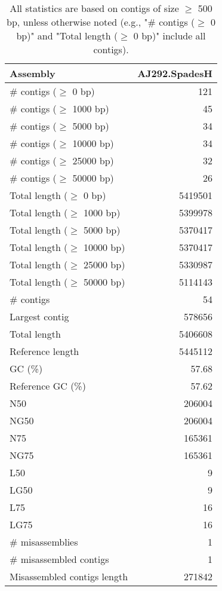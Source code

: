 \documentclass[12pt,a4paper]{article}
\begin{document}
\begin{table}[ht]
\begin{center}
\caption{All statistics are based on contigs of size $\geq$ 500 bp, unless otherwise noted (e.g., "\# contigs ($\geq$ 0 bp)" and "Total length ($\geq$ 0 bp)" include all contigs).}
\begin{tabular}{|l*{1}{|r}|}
\hline
Assembly & AJ292.SpadesH \\ \hline
\# contigs ($\geq$ 0 bp) & 121 \\ \hline
\# contigs ($\geq$ 1000 bp) & 45 \\ \hline
\# contigs ($\geq$ 5000 bp) & 34 \\ \hline
\# contigs ($\geq$ 10000 bp) & 34 \\ \hline
\# contigs ($\geq$ 25000 bp) & 32 \\ \hline
\# contigs ($\geq$ 50000 bp) & 26 \\ \hline
Total length ($\geq$ 0 bp) & 5419501 \\ \hline
Total length ($\geq$ 1000 bp) & 5399978 \\ \hline
Total length ($\geq$ 5000 bp) & 5370417 \\ \hline
Total length ($\geq$ 10000 bp) & 5370417 \\ \hline
Total length ($\geq$ 25000 bp) & 5330987 \\ \hline
Total length ($\geq$ 50000 bp) & 5114143 \\ \hline
\# contigs & 54 \\ \hline
Largest contig & 578656 \\ \hline
Total length & 5406608 \\ \hline
Reference length & 5445112 \\ \hline
GC (\%) & 57.68 \\ \hline
Reference GC (\%) & 57.62 \\ \hline
N50 & 206004 \\ \hline
NG50 & 206004 \\ \hline
N75 & 165361 \\ \hline
NG75 & 165361 \\ \hline
L50 & 9 \\ \hline
LG50 & 9 \\ \hline
L75 & 16 \\ \hline
LG75 & 16 \\ \hline
\# misassemblies & 1 \\ \hline
\# misassembled contigs & 1 \\ \hline
Misassembled contigs length & 271842 \\ \hline

\end{tabular}
\end{center}
\end{table}
\end{document}
